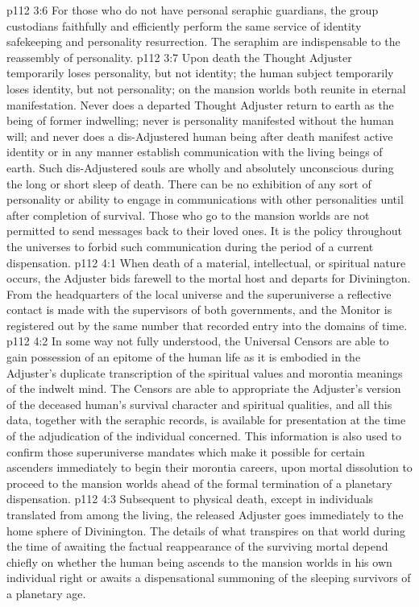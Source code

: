 \vs p112 3:6 For those who do not have personal seraphic guardians, the group custodians faithfully and efficiently perform the same service of identity safekeeping and personality resurrection. The seraphim are indispensable to the reassembly of personality.
\vs p112 3:7 Upon death the Thought Adjuster temporarily loses personality, but not identity; the human subject temporarily loses identity, but not personality; on the mansion worlds both reunite in eternal manifestation. Never does a departed Thought Adjuster return to earth as the being of former indwelling; never is personality manifested without the human will; and never does a dis\hyp{}Adjustered human being after death manifest active identity or in any manner establish communication with the living beings of earth. Such dis\hyp{}Adjustered souls are wholly and absolutely unconscious during the long or short sleep of death. There can be no exhibition of any sort of personality or ability to engage in communications with other personalities until after completion of survival. Those who go to the mansion worlds are not permitted to send messages back to their loved ones. It is the policy throughout the universes to forbid such communication during the period of a current dispensation.
\vs p112 4:1 When death of a material, intellectual, or spiritual nature occurs, the Adjuster bids farewell to the mortal host and departs for Divinington. From the headquarters of the local universe and the superuniverse a reflective contact is made with the supervisors of both governments, and the Monitor is registered out by the same number that recorded entry into the domains of time.
\vs p112 4:2 In some way not fully understood, the Universal Censors are able to gain possession of an epitome of the human life as it is embodied in the Adjuster’s duplicate transcription of the spiritual values and morontia meanings of the indwelt mind. The Censors are able to appropriate the Adjuster’s version of the deceased human’s survival character and spiritual qualities, and all this data, together with the seraphic records, is available for presentation at the time of the adjudication of the individual concerned. This information is also used to confirm those superuniverse mandates which make it possible for certain ascenders immediately to begin their morontia careers, upon mortal dissolution to proceed to the mansion worlds ahead of the formal termination of a planetary dispensation.
\vs p112 4:3 Subsequent to physical death, except in individuals translated from among the living, the released Adjuster goes immediately to the home sphere of Divinington. The details of what transpires on that world during the time of awaiting the factual reappearance of the surviving mortal depend chiefly on whether the human being ascends to the mansion worlds in his own individual right or awaits a dispensational summoning of the sleeping survivors of a planetary age.
